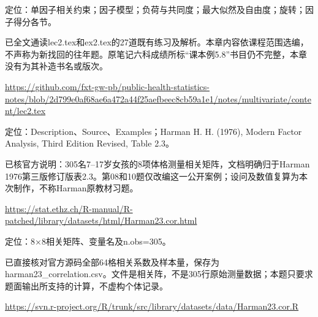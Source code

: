 \par\noindent\begin{minipage}{\linewidth}\label{src:NOTE-M2}
\par
定位：单因子相关约束；因子模型；负荷与共同度；最大似然及自由度；旋转；因子得分各节。\par
已全文通读lec2.tex和ex2.tex的27道既有练习及解析。本章内容依课程范围选编，不声称为新找回的往年题。原笔记六科成绩所标“课本例5.8”书目仍不完整，本章没有为其补造书名或版次。\par
{\small\url{https://github.com/fxt-gw-pb/public-health-statistics-notes/blob/2d799e0af68ae6a472a44f25aefbeec8cb59a1e1/notes/multivariate/content/lec2.tex}}\par
\end{minipage}\par\medskip

\par\noindent\begin{minipage}{\linewidth}\label{src:R-HARMAN23}
\par
定位：Description、Source、Examples；Harman H. H. (1976), Modern Factor Analysis, Third Edition Revised, Table 2.3。\par
已核官方说明：305名7--17岁女孩的8项体格测量相关矩阵，文档明确归于Harman 1976第三版修订版表2.3。第08和10题仅改编这一公开案例；设问及数值复算为本次制作，不称Harman原教材习题。\par
{\small\url{https://stat.ethz.ch/R-manual/R-patched/library/datasets/html/Harman23.cor.html}}\par
\end{minipage}\par\medskip

\par\noindent\begin{minipage}{\linewidth}\label{src:R-HARMAN23-DATA}
\par
定位：8×8相关矩阵、变量名及n.obs=305。\par
已直接核对官方源码全部64格相关系数及样本量，保存为harman23\_correlation.csv。文件是相关阵，不是305行原始测量数据；本题只要求题面输出所支持的计算，不虚构个体记录。\par
{\small\url{https://svn.r-project.org/R/trunk/src/library/datasets/data/Harman23.cor.R}}\par
\end{minipage}\par\medskip

